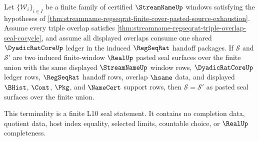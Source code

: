 \begin{theorem}
\label{thm:streamname-regseqrat-finite-cover-pasted-seal-terminality}
Let $\{\mathcal{W}_i\}_{i\in I}$ be a finite family of certified
$\StreamNameUp$ windows satisfying the hypotheses of
\autoref{thm:streamname-regseqrat-finite-cover-pasted-source-exhaustion}.
Assume every triple overlap satisfies
\autoref{thm:streamname-regseqrat-triple-overlap-seal-cocycle}, and assume all
displayed overlaps consume one shared $\DyadicRatCoreUp$ ledger in the induced
$\RegSeqRat$ handoff packages. If $\mathcal{S}$ and $\mathcal{S}'$ are two
induced finite-window $\RealUp$ pasted seal surfaces over the finite union with
the same displayed $\StreamNameUp$ window rows, $\DyadicRatCoreUp$ ledger rows,
$\RegSeqRat$ handoff rows, overlap $\hsame$ data, and displayed $\BHist$,
$\Cont$, $\Pkg$, and $\NameCert$ support rows, then $\mathcal{S}=\mathcal{S}'$
as pasted seal surfaces over the finite union.

This terminality is a finite L10 seal statement. It contains no completion
data, quotient data, host index equality, selected limits, countable choice, or
$\RealUp$ completeness.
\end{theorem}
